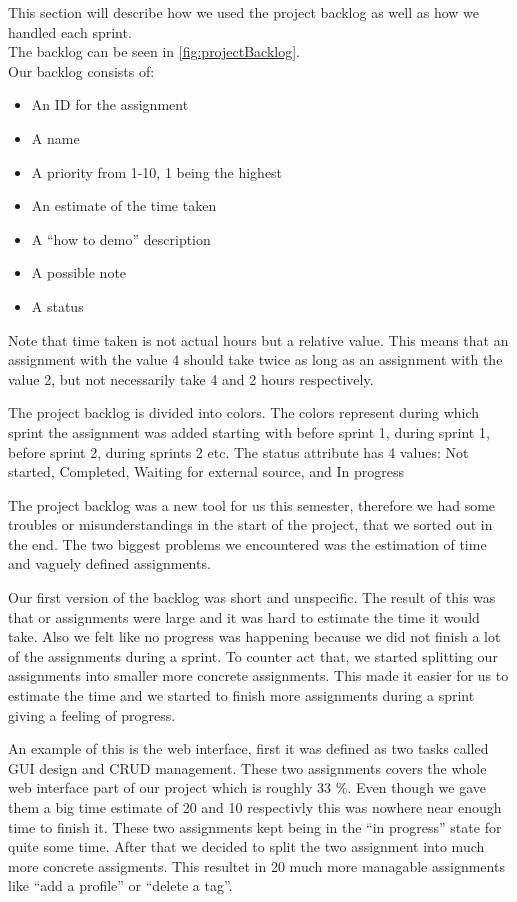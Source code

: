This section will describe how we used the project backlog as well as how we handled each sprint. \\

The backlog can be seen in \autoref{fig:projectBacklog}. \\

Our backlog consists of: 
\begin{itemize}
\item An ID for the assignment
\item A name 
\item A priority from 1-10, 1 being the highest
\item An estimate of the time taken
\item A ``how to demo'' description
\item A possible note
\item A status 	
\end{itemize}
Note that time taken is not actual hours but a relative value. This means that an assignment with the value 4 should take twice as long as an assignment with the value 2, but not necessarily take 4 and 2 hours respectively.

The project backlog is divided into colors. The colors represent during which sprint the assignment was added starting with before sprint 1, during sprint 1, before sprint 2, during sprints 2 etc. The status attribute has 4 values: Not started, Completed, Waiting for external source, and In progress

The project backlog was a new tool for us this semester, therefore we had some troubles or misunderstandings in the start of the project, that we sorted out in the end. The two biggest problems we encountered was the estimation of time and vaguely defined assignments. 

Our first version of the backlog was short and unspecific. The result of this was that or assignments were large and it was hard to estimate the time it would take. Also we felt like no progress was happening because we did not finish a lot of the assignments during a sprint. To counter act that, we started splitting our assignments into smaller more concrete assignments. This made it easier for us to estimate the time and we started to finish more assignments during a sprint giving a feeling of progress. 

An example of this is the web interface, first it was defined as two tasks called GUI design and CRUD management. These two assignments covers the whole web interface part of our project which is roughly 33 \%. Even though we gave them a big time estimate of 20 and 10 respectivly this was nowhere near enough time to finish it. These two assignments kept being in the ``in progress'' state for quite some time. After that we decided to split the two assignment into much more concrete assigments. This resultet in 20 much more managable assignments like ``add a profile'' or ``delete a tag''. 


